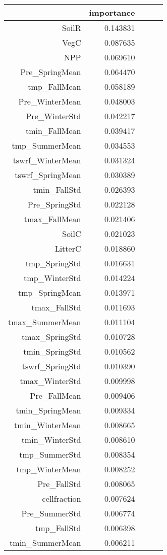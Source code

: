 \begin{table}[h]
\centering
\label{table:5}
\begin{tabular}{rrrrr}
\toprule
 & importance \\
\midrule
SoilR & 0.143831 \\
VegC & 0.087635 \\
NPP & 0.069610 \\
Pre_SpringMean & 0.064470 \\
tmp_FallMean & 0.058189 \\
Pre_WinterMean & 0.048003 \\
Pre_WinterStd & 0.042217 \\
tmin_FallMean & 0.039417 \\
tmp_SummerMean & 0.034553 \\
tswrf_WinterMean & 0.031324 \\
tswrf_SpringMean & 0.030389 \\
tmin_FallStd & 0.026393 \\
Pre_SpringStd & 0.022128 \\
tmax_FallMean & 0.021406 \\
SoilC & 0.021023 \\
LitterC & 0.018860 \\
tmp_SpringStd & 0.016631 \\
tmp_WinterStd & 0.014224 \\
tmp_SpringMean & 0.013971 \\
tmax_FallStd & 0.011693 \\
tmax_SummerMean & 0.011104 \\
tmax_SpringStd & 0.010728 \\
tmin_SpringStd & 0.010562 \\
tswrf_SpringStd & 0.010390 \\
tmax_WinterStd & 0.009998 \\
Pre_FallMean & 0.009406 \\
tmin_SpringMean & 0.009334 \\
tmin_WinterMean & 0.008665 \\
tmin_WinterStd & 0.008610 \\
tmp_SummerStd & 0.008354 \\
tmp_WinterMean & 0.008252 \\
Pre_FallStd & 0.008065 \\
cellfraction & 0.007624 \\
Pre_SummerStd & 0.006774 \\
tmp_FallStd & 0.006398 \\
tmin_SummerMean & 0.006211 \\

\end{tabular}
\end{table}
